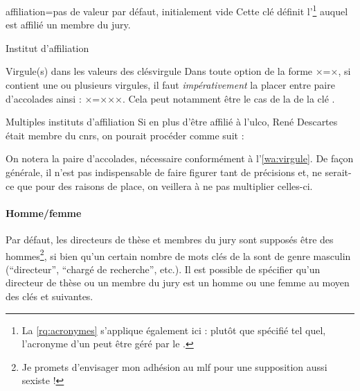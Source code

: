 \begin{docKey}{affiliation}{=}{pas de valeur par défaut,
    initialement vide}
  Cette clé définit l'\footnote{La \vref{rq:acronymes}
    s'applique également ici : plutôt que spécifié tel quel, l'acronyme d'un
     peut être géré par le .} auquel est
  affilié un membre du jury.
\end{docKey}
\begin{dbexample}{Institut d'affiliation}{}
\begin{bodycode}
\end{bodycode}
\end{dbexample}
%
\begin{dbwarning}{Virgule(s) dans les valeurs des clés}{virgule}
  Dans toute option de la forme ×=×, si 
  contient une ou plusieurs virgules, il faut \emph{impérativement} la placer
  entre paire d'accolades ainsi : ×={××}×. Cela peut
  notamment être le cas de la  de la clé .
\end{dbwarning}
%
\begin{dbexample}{Multiples instituts d'affiliation}{}
  Si en plus d'être affilié à l'\gls{ulco}, René Descartes était membre du
  \gls{cnrs}, on pourait procéder comme suit :
\begin{bodycode}
\end{bodycode}
On notera la paire d'accolades, nécessaire conformément
à l'\vref{wa:virgule}. De façon générale, il n'est pas indispensable de faire
figurer tant de précisions et, ne serait-ce que pour des raisons de place, on
veillera à ne pas multiplier celles-ci.
\end{dbexample}

\paragraph{Homme/femme}
\label{sec:hommefemme}


Par défaut, les directeurs de thèse et membres du jury sont supposés être des
hommes\footnote{Je promets d'envisager mon adhésion au \acrshort{mlf} pour une
  supposition aussi sexiste !}, si bien qu'un certain nombre de mots clés de la
\yatcl{} sont de genre masculin (\enquote{directeur}, \enquote{chargé de
  recherche}, etc.). Il est possible de spécifier qu'un directeur de thèse ou
un membre du jury est un homme ou une femme au moyen des clés  et
 suivantes.

